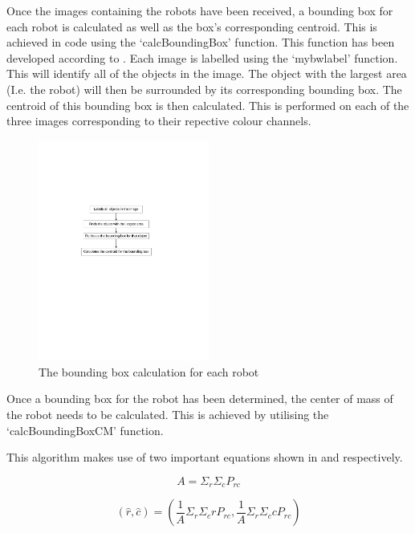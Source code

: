\documentclass{article}
\begin{document}
Once the images containing the robots have been received, a bounding box for each robot is calculated as well as the box's corresponding centroid. This is achieved in code using the `calcBoundingBox' function. This function has been developed according to . Each image is labelled using the `mybwlabel' function. This will identify all of the objects in the image. The object with the largest area (I.e. the robot) will then be surrounded by its corresponding bounding box. The centroid of this bounding box is then calculated. This is performed on each of the three images corresponding to their repective colour channels.

\begin{figure}[h!] 
  \centering
    \includegraphics[width=0.5\textwidth]{../Drawings/boundingbox.pdf}
    \caption{The bounding box calculation for each robot }
    \label{fig:bounding}
\end{figure}

Once a bounding box for the robot has been determined, the center of mass of the robot needs to be calculated. This is achieved by utilising the `calcBoundingBoxCM' function.

This algorithm makes use of two important equations shown in  and  respectively.

\begin{equation}
A = \Sigma_{r}\Sigma_{c}P_{rc}
\label{eqn:area}
\end{equation}

\begin{equation}
(\widehat{r}, \widehat{c}) = (\frac{1}{A}\Sigma_{r}\Sigma_{c}r P_{rc}, \frac{1}{A}\Sigma_{r}\Sigma_{c}c P_{rc})
\label{eqn:cm}
\end{equation}
\end{document}
